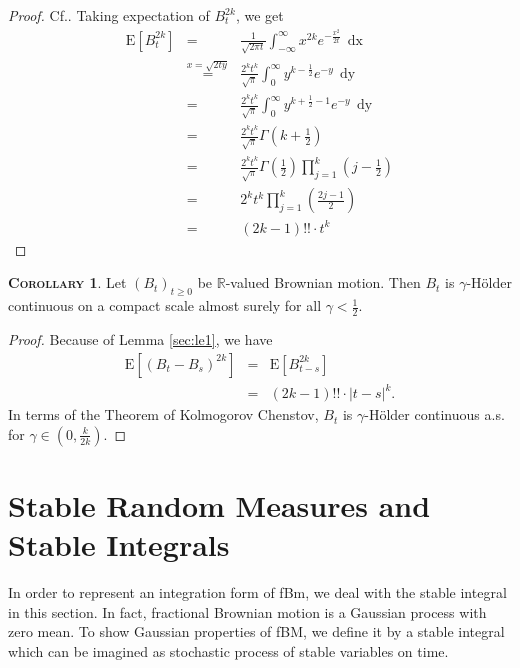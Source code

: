 \documentclass[a4paper, twoside, 11pt]{article}
\theoremstyle{definition}
\newtheorem{corollary}[definition]{\scshape Corollary}
\begin{document}
  \begin{proof}
	Cf.\cite{shilling}. Taking expectation of $B_t^{2k}$, we get
	\begin{eqnarray*}
	  \mathrm{E}[B_t^{2k}] &=& \frac{1}{\sqrt{2\pi t}}\int_{-\infty}^{\infty} x^{2k} e^{-\frac{x^2}{2t}}\,\mathop{dx}\\
	  &\overset{x=\sqrt{2ty}}{=}& \frac{2^kt^k}{\sqrt{\pi}} \int_0^{\infty} y^{k-\frac{1}{2}} e^{-y}\,\mathop{dy}\\
	  &=& \frac{2^kt^k}{\sqrt{\pi}} \int_0^{\infty} y^{k+\frac{1}{2}-1} e^{-y}\,\mathop{dy}\\
	  &=& \frac{2^kt^k}{\sqrt{\pi}} \Gamma(k + \frac{1}{2})\\
	  &=& \frac{2^kt^k}{\sqrt{\pi}} \Gamma(\frac{1}{2})\prod_{j=1}^k(j-\frac{1}{2}) \\
	  &=& 2^k t^k\prod_{j=1}^k(\frac{2j-1}{2}) \\
	  &=& (2k - 1)!!\cdot t^k
	\end{eqnarray*}
  \end{proof}

  \begin{corollary}
	Let $(B_t)_{t\ge 0}$ be $\mathbb{R}$-valued Brownian motion. Then $B_t$ is $\gamma$-H\"older continuous on a compact scale almost surely for all $\gamma < \frac{1}{2}$.
  \end{corollary}

  \begin{proof}
	Because of Lemma \ref{sec:le1}, we have
	\begin{eqnarray*}
	  \mathrm{E}[(B_t-B_s)^{2k}] &=& \mathrm{E}[B_{t-s}^{2k}]\\
	  &=& (2k - 1)!! \cdot |t-s|^{k}.
	\end{eqnarray*}
	In terms of the Theorem of Kolmogorov Chenstov, $B_t$ is $\gamma$-H\"older continuous a.s. for $\gamma \in (0, \frac{k}{2k})$.
  \end{proof}

  \newpage

  \section{Stable Random Measures and Stable Integrals}
  \setcounter{equation}{0}
  In order to represent an integration form of fBm, we deal with the stable integral in this section. In fact, fractional Brownian motion is a Gaussian process with zero mean. To show Gaussian properties of fBM, we define it by a 
  stable integral which can be imagined as stochastic process of stable variables on time.
\end{document}
